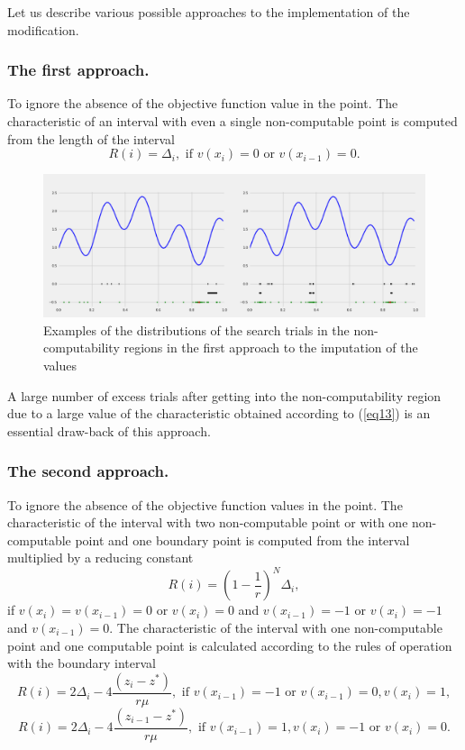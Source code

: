 \documentclass[runningheads]{llncs}
\begin{document}
Let us describe various possible approaches to the implementation of the modification.

\subsubsection{The first approach.}To ignore the absence of the objective function value in the point. The characteristic of an interval with even a single non-computable point is computed from the length of the interval
\begin{equation}\label{eq13} 
R(i)=\Delta _i, \text{ if } v(x_i)=0 \text{ or } v(x_{i-1})=0.
\end{equation}

\begin{figure}
\includegraphics[width=\textwidth]{fig1.png}
\caption{Examples of the distributions of the search trials in the non-computability regions in the first approach to the imputation of the values} \label{fig1}
\end{figure}

A large number of excess trials after getting into the non-computability region due to a large value of the characteristic obtained according to (\ref{eq13}) is an essential draw-back of this approach.

\subsubsection{The second approach.} To ignore the absence of the objective function values in the point. The characteristic of the interval with two non-computable point or with one non-computable point and one boundary point is computed from the interval multiplied by a reducing constant
\begin{equation}\label{eq14} 
R(i)={(1- \frac {1}{r})}^N \Delta _i,
\end{equation}
if $v(x_i)=v(x_{i-1})=0$ or $v(x_i)=0$ and $v(x_{i-1})=-1$ or $v(x_i)=-1$ and $v(x_{i-1})=0$.
The characteristic of the interval with one non-computable point and one computable point is calculated according to the rules of operation with the boundary interval
\begin{equation}\label{eq15} 
R(i)=2\Delta _i-4 \frac {(z_i-z^*)}{r \mu},\text{ if } v(x_{i-1})=-1  \text{ or } v(x_{i-1})=0, v(x_i)=1,
\end{equation}
\begin{equation}\label{eq16} 
R(i)=2\Delta _i-4 \frac {(z_{i-1}-z^*)}{r \mu},\text{ if } v(x_{i-1})=1, v(x_i)=-1 \text{ or } v(x_i)=0.
\end{equation}
\end{document}
